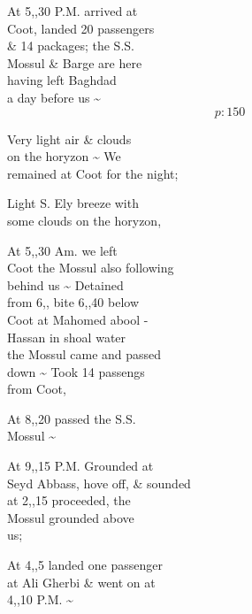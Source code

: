 \documentclass{report}
\begin{document}
	\par{
 	At 5,,30 P.M. arrived at\ \\Coot, landed 20 passengers\ \\\& 14 packages; the S.S.\ \\Mossul \& Barge are here\ \\having left Baghdad\ \\a day before us \~{}\ \\
  \[p: 150 \]

	}

	\par{
 	Very light air \& clouds\ \\on the horyzon \~{} We\ \\remained at Coot for the night;\ \\
	}

	\par{
 	Light S. Ely breeze with\ \\some clouds on the horyzon,\ \\
	}

	\par{
 	At 5,,30 Am. we left\ \\Coot the Mossul also following\ \\behind us \~{} Detained\ \\from 6,, bite 6,,40 below\ \\Coot at Mahomed abool -\ \\Hassan in shoal water\ \\the Mossul came and passed\ \\down \~{} Took 14 passengs\ \\from Coot,\ \\
	}

	\par{
 	At 8,,20 passed the S.S.\ \\Mossul \~{}\ \\
	}

	\par{
 	At 9,,15 P.M. Grounded at\ \\Seyd Abbass, hove off, \& sounded\ \\at 2,,15 proceeded, the\ \\Mossul grounded above\ \\us;\ \\
	}

	\par{
 	At 4,,5 landed one passenger\ \\at Ali Gherbi \& went on at\ \\4,,10 P.M. \~{}\ \\
	}
\end{document}
